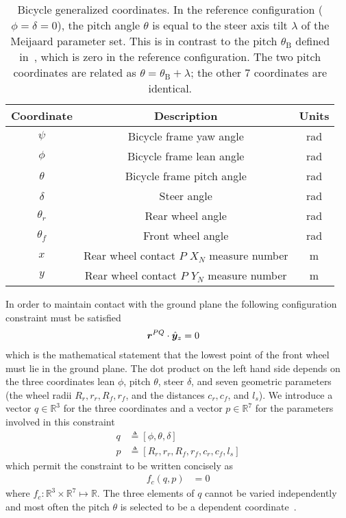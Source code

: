\begin{table}[htbp]
  \centering
  \begin{tabular}{ccc}
    \toprule
    Coordinate & Description & Units \\
    \midrule
    $\psi$ & Bicycle frame yaw angle & \si{\radian} \\
    $\phi$ & Bicycle frame lean angle & \si{\radian} \\
    $\theta$ & Bicycle frame pitch angle  & \si{\radian} \\
    $\delta$ & Steer angle & \si{\radian} \\
    $\theta_r$ & Rear wheel angle & \si{\radian} \\
    $\theta_f$ & Front wheel angle & \si{\radian} \\
    $x$ & Rear wheel contact $P$ $X_N$ measure number & \si{\m} \\
    $y$ & Rear wheel contact $P$ $Y_N$ measure number & \si{\m} \\
    \bottomrule
  \end{tabular}
  \caption[Bicycle generalized coordinates.]{Bicycle generalized coordinates.
    In the reference configuration ($\phi= \delta=0$), the pitch angle $\theta$
    is equal to the steer axis tilt $\lambda$ of the Meijaard parameter set.
    This is in contrast to the pitch $\theta_{\text{B}}$ defined
    in~\cite{Meijaard2007}, which is zero in the reference configuration. The
    two pitch coordinates are related as $\theta = \theta_{\text{B}} +
    \lambda$; the other 7 coordinates are identical.}
  \label{model:tab:coordinates}
\end{table}

In order to maintain contact with the ground plane the following configuration
constraint must be satisfied
\begin{align}
  \boldsymbol{r}^{PQ} \cdot \hat{\boldsymbol{y}}_{z} &= 0
\end{align}
which is the mathematical statement that the lowest point of the front wheel
must lie in the ground plane. The dot product on the left hand side depends on
the three coordinates lean $\phi$, pitch $\theta$, steer $\delta$, and seven
geometric parameters (the wheel radii $R_r, r_r, R_f, r_f$, and the distances
$c_r, c_f$, and $l_s$). We introduce a vector $q\in\mathbb{R}^3$ for the three
coordinates and a vector $p\in\mathbb{R}^7$ for the parameters involved in this
constraint
\begin{align}
  q &\triangleq \left[\phi, \theta, \delta\right]\label{model:q_min}\\
  p &\triangleq \left[R_r, r_r, R_f, r_f, c_r, c_f, l_s\right]
  \label{model:constraint_parameters}
\end{align}
which permit the constraint to be written concisely as
\begin{align}
  f_c(q, p) &= 0
  \label{model:f_c}
\end{align}
where $f_c : \mathbb{R}^3 \times \mathbb{R}^7 \mapsto \mathbb{R}$.  The three
elements of $q$ cannot be varied independently and most often the pitch $\theta$
is selected to be a dependent coordinate~\cite{Peterson2008a}.

